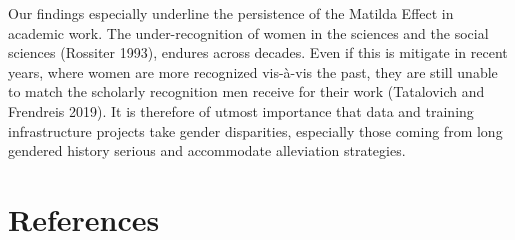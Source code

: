 \documentclass[
]{ccr}
\begin{document}
Our findings especially underline the persistence of the Matilda Effect
in academic work. The under-recognition of women in the sciences and the
social sciences (Rossiter 1993), endures across decades. Even if this is
mitigate in recent years, where women are more recognized vis-à-vis the
past, they are still unable to match the scholarly recognition men
receive for their work (Tatalovich and Frendreis 2019). It is therefore
of utmost importance that data and training infrastructure projects take
gender disparities, especially those coming from long gendered history
serious and accommodate alleviation strategies.

\newpage

\hypertarget{references}{%
\section*{References}\label{references}}
\end{document}
